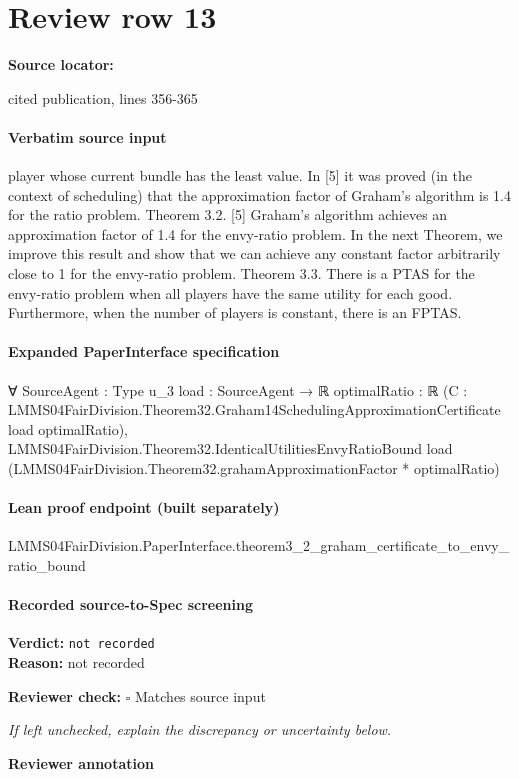 \documentclass[10pt]{article}
\newcommand{\reviewerbox}{%
  \par\noindent\fbox{\parbox{0.96\linewidth}{\rule{0pt}{0.38in}}}\par
}
\newcommand{\reviewmatch}[1]{%
  \par\noindent\textbf{Reviewer check:} $\square$\; #1\par
  \noindent\emph{If left unchecked, explain the discrepancy or uncertainty below.}\par
}
\begin{document}
\section*{Review row 13}
\textbf{Source locator:} {\footnotesize\raggedright cited publication, lines 356-\allowbreak{}365\par}
\paragraph{Verbatim source input}
\begin{ReviewVerbatim}
player whose current bundle has the least value. In [5] it was
proved (in the context of scheduling) that the approximation
factor of Graham’s algorithm is 1.4 for the ratio problem.
Theorem 3.2. [5] Graham’s algorithm achieves an approximation factor of 1.4 for the envy-ratio problem.
In the next Theorem, we improve this result and show
that we can achieve any constant factor arbitrarily close to
1 for the envy-ratio problem.
Theorem 3.3. There is a PTAS for the envy-ratio problem when all players have the same utility for each good.
Furthermore, when the number of players is constant, there
is an FPTAS.
\end{ReviewVerbatim}


\paragraph{Expanded PaperInterface specification}
\begin{ReviewVerbatim}
∀ {SourceAgent : Type u_3} {load : SourceAgent → ℝ} {optimalRatio : ℝ}
  (C : LMMS04FairDivision.Theorem32.Graham14SchedulingApproximationCertificate load optimalRatio),
  LMMS04FairDivision.Theorem32.IdenticalUtilitiesEnvyRatioBound load
    (LMMS04FairDivision.Theorem32.grahamApproximationFactor * optimalRatio)
\end{ReviewVerbatim}

\paragraph{Lean proof endpoint (built separately)}\begin{ReviewVerbatim}
LMMS04FairDivision.PaperInterface.theorem3_2_graham_certificate_to_envy_ratio_bound
\end{ReviewVerbatim}

\paragraph{Recorded source-to-Spec screening}
\textbf{Verdict:} \texttt{not recorded}
\\
\textbf{Reason:} not recorded
\reviewmatch{Matches source input}
\noindent\textbf{Reviewer annotation}\par
\reviewerbox
\clearpage
\hypertarget{source-claim-c5095878a67ee745}{}
\end{document}
